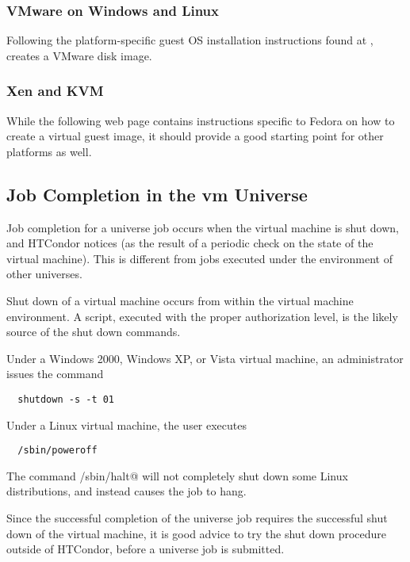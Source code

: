 \subsubsection{\label{sec:vm-disk-image-details-vmware}
VMware on Windows and Linux}

Following the platform-specific
guest OS installation instructions found at
,
creates a VMware disk image.

\subsubsection{\label{sec:vm-disk-image-details-xen}Xen and KVM}
While the following web page contains instructions specific to
Fedora on how to create a virtual guest image,
it should provide a good starting point for 
other platforms as well.


\subsection{\label{sec:vm-job-completion-details}Job Completion in the vm Universe}

Job completion for a  universe job occurs when 
the virtual machine is shut down, and HTCondor notices 
(as the result of a periodic check on the state of the virtual machine).
This is different from jobs executed under the environment of other 
universes.

Shut down of a virtual machine occurs from within the virtual
machine environment.
A script, executed with the proper authorization level,
is the likely source of the shut down commands.

Under a Windows 2000, Windows XP, or Vista virtual machine,
an administrator issues the command
\begin{verbatim}
  shutdown -s -t 01
\end{verbatim}

Under a Linux virtual machine,
the  user executes
\begin{verbatim}
  /sbin/poweroff
\end{verbatim}
The command \verb@/sbin/halt@ will not completely
shut down some Linux distributions, and instead
causes the job to hang.

Since the successful completion of the  universe job
requires the successful shut down of the virtual machine,
it is good advice to try the shut down procedure outside of
HTCondor, before a  universe job is submitted.


